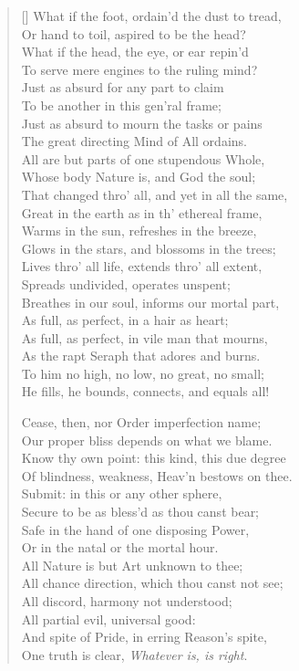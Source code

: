 \begin{verse}[\versewidth]
What if the foot, ordain'd the dust to tread,\\
Or hand to toil, aspired to be the head?\\
What if the head, the eye, or ear repin'd\\
To serve mere engines to the ruling mind?\\
Just as absurd for any part to claim\\
To be another in this gen'ral frame;\\
Just as absurd to mourn the tasks or pains\\
The great directing Mind of All ordains.\\
\vin All are but parts of one stupendous Whole,\\
Whose body Nature is, and God the soul;\\
That changed thro' all, and yet in all the same,\\
Great in the earth as in th' ethereal frame,\\
Warms in the sun, refreshes in the breeze,\\
Glows in the stars, and blossoms in the trees;\\
Lives thro' all life, extends thro' all extent,\\
Spreads undivided, operates unspent;\\
Breathes in our soul, informs our mortal part,\\
As full, as perfect, in a hair as heart;\\
As full, as perfect, in vile man that mourns,\\
As the rapt Seraph that adores and burns.\\
To him no high, no low, no great, no small;\\
He fills, he bounds, connects, and equals all!

Cease, then, nor Order imperfection name;\\
Our proper bliss depends on what we blame.\\
Know thy own point: this kind, this due degree\\
Of blindness, weakness, Heav'n bestows on thee.\\
Submit: in this or any other sphere,\\
Secure to be as bless'd as thou canst bear;\\
Safe in the hand of one disposing Power,\\
Or in the natal or the mortal hour.\\
All Nature is but Art unknown to thee;\\
All chance direction, which thou canst not see;\\
All discord, harmony not understood;\\
All partial evil, universal good:\\
And spite of Pride, in erring Reason's spite,\\
One truth is clear, \textit{Whatever is, is right}.
\end{verse}

